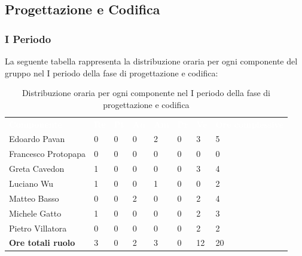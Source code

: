 \subsection{Progettazione e Codifica}
\subsubsection{I Periodo}
La seguente tabella rappresenta la distribuzione oraria per ogni componente del gruppo nel I periodo della fase di progettazione e codifica:
\begin{table}[H]
\begin{center}
\renewcommand{\arraystretch}{1.25}
\begin{tabular}{ m{}<{\centering}  m{}<{\centering} m{}<{\centering} m{}<{\centering}  m{}<{\centering}  m{}<{\centering}  m{}<{\centering}  m{}<{\centering}   }
	\rowcolor{darkblue}
	\textcolor{white}{\textbf{Componente}} &\textcolor{white}{\textbf{Re}}&\textcolor{white}{\textbf{Pt}}&\textcolor{white}{\textbf{An}}&\textcolor{white}{\textbf{Am}}&\textcolor{white}{\textbf{Pr}}&\textcolor{white}{\textbf{Ve}}&\textcolor{white}{\textbf{Ore complessive}}\\ 
	Edoardo Pavan & 0 & 0 & 0 & 2 & 0 & 3 & 5 \\	
	
	Francesco Protopapa & 0 & 0 & 0 & 0 & 0 & 0 & 0 \\

	Greta Cavedon & 1 & 0 & 0 & 0 & 0 & 3 & 4 \\
	
	Luciano Wu & 1 & 0 & 0 & 1 & 0 & 0 & 2 \\
	
	Matteo Basso & 0 & 0 & 2 & 0 & 0 & 2 & 4 \\
	
	Michele Gatto & 1 & 0 & 0 & 0 & 0 & 2 & 3 \\
	
	Pietro Villatora & 0 & 0 & 0 & 0 & 0 & 2 & 2 \\
	
	\textbf{Ore totali ruolo} & 3 & 0 & 2 & 3 & 0 & 12 & 20 \\

\end{tabular}
\caption{Distribuzione oraria per ogni componente nel I periodo della fase di progettazione e codifica}
\end{center}
\end{table}

